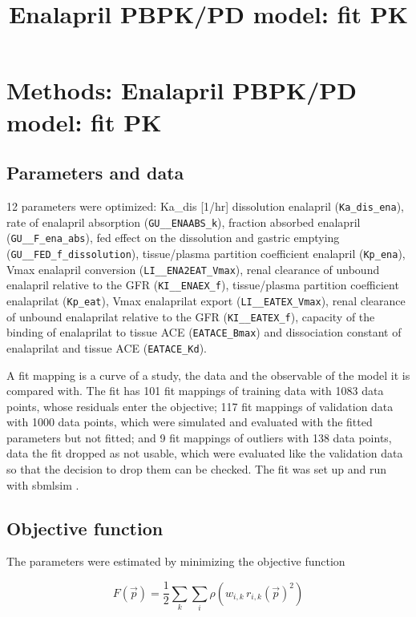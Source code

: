 \documentclass{article}
\title{Enalapril PBPK/PD model: fit PK}
\date{}
\begin{document}
\maketitle

\section{Methods: Enalapril PBPK/PD model: fit PK}

\subsection{Parameters and data}

12 parameters were optimized: Ka\_dis [1/hr] dissolution enalapril (\texttt{Ka\_dis\_ena}), rate of enalapril absorption (\texttt{GU\_\_ENAABS\_k}), fraction absorbed enalapril (\texttt{GU\_\_F\_ena\_abs}), fed effect on the dissolution and gastric emptying (\texttt{GU\_\_FED\_f\_dissolution}), tissue/plasma partition coefficient enalapril (\texttt{Kp\_ena}), Vmax enalapril conversion (\texttt{LI\_\_ENA2EAT\_Vmax}), renal clearance of unbound enalapril relative to the GFR (\texttt{KI\_\_ENAEX\_f}), tissue/plasma partition coefficient enalaprilat (\texttt{Kp\_eat}), Vmax enalaprilat export (\texttt{LI\_\_EATEX\_Vmax}), renal clearance of unbound enalaprilat relative to the GFR (\texttt{KI\_\_EATEX\_f}), capacity of the binding of enalaprilat to tissue ACE (\texttt{EATACE\_Bmax}) and dissociation constant of enalaprilat and tissue ACE (\texttt{EATACE\_Kd}).

A fit mapping is a curve of a study, the data and the observable of the model it is compared with. The fit has 101 fit mappings of training data with 1083 data points, whose residuals enter the objective; 117 fit mappings of validation data with 1000 data points, which were simulated and evaluated with the fitted parameters but not fitted; and 9 fit mappings of outliers with 138 data points, data the fit dropped as not usable, which were evaluated like the validation data so that the decision to drop them can be checked. The fit was set up and run with sbmlsim \cite{Koenig2026_sbmlsim}.

\subsection{Objective function}

The parameters were estimated by minimizing the objective function

\begin{equation}
F(\vec{p}) = \frac{1}{2} \sum_{k} \sum_{i} \rho\left(w_{i,k}\, r_{i,k}(\vec{p})^2\right)
\end{equation}
\end{document}
